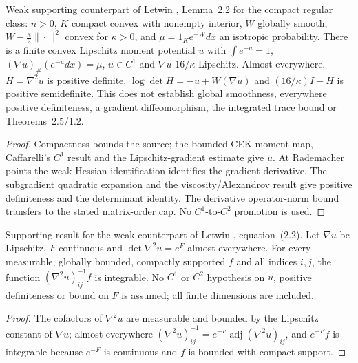 \begin{lemma}
  \label{lem:letwin-weak-regular-moment-potential}
  \leanok
  Weak supporting counterpart of Letwin \cite{Letwin2026QuadraticKLS}, Lemma~2.2 for the compact
  regular class: $n>0$, $K$ compact convex with nonempty interior, $W$ globally smooth,
  $W-\frac\kappa2\|\cdot\|^2$ convex for $\kappa>0$, and $\mu=1_K e^{-W}dx$ an isotropic
  probability. There is a finite convex Lipschitz moment potential $u$ with $\int e^{-u}=1$,
  $(\nabla u)_\#(e^{-u}dx)=\mu$, $u\in C^1$ and $\nabla u$ $16/\kappa$-Lipschitz. Almost everywhere,
  $H=\nabla^2u$ is positive definite, $\log\det H=-u+W(\nabla u)$ and
  $(16/\kappa)I-H$ is positive semidefinite.
  This does not establish global smoothness, everywhere positive definiteness, a gradient
  diffeomorphism, the integrated trace bound or Theorems~2.5/1.2.
\end{lemma}
\begin{proof}
  \leanok
  Compactness bounds the source; the bounded CEK moment map, Caffarelli's $C^1$ result and the
  Lipschitz-gradient estimate give $u$. At Rademacher points the weak Hessian identification
  identifies the gradient derivative. The subgradient quadratic expansion and the
  viscosity/Alexandrov result give positive definiteness and the determinant identity. The derivative
  operator-norm bound transfers to the stated matrix-order cap. No $C^1$-to-$C^2$ promotion is used.
\end{proof}

\begin{lemma}
  \label{lem:letwin-weak-inverse-hessian-integrability}
  \leanok
  Supporting result for the weak counterpart of Letwin \cite{Letwin2026QuadraticKLS}, equation~(2.2).
  Let $\nabla u$ be Lipschitz, $F$ continuous and $\det\nabla^2u=e^{F}$ almost everywhere. For every measurable,
  globally bounded, compactly supported $f$ and all indices $i,j$, the function $(\nabla^2u)^{-1}_{ij}f$ is
  integrable. No $C^1$ or $C^2$ hypothesis on $u$, positive definiteness or bound on $F$ is assumed; all finite
  dimensions are included.
\end{lemma}
\begin{proof}
  \leanok
  The cofactors of $\nabla^2u$ are measurable and bounded by the Lipschitz constant of $\nabla u$; almost
  everywhere $(\nabla^2u)^{-1}_{ij}=e^{-F}\operatorname{adj}(\nabla^2u)_{ij}$, and $e^{-F}f$ is integrable because
  $e^{-F}$ is continuous and $f$ is bounded with compact support.
\end{proof}

